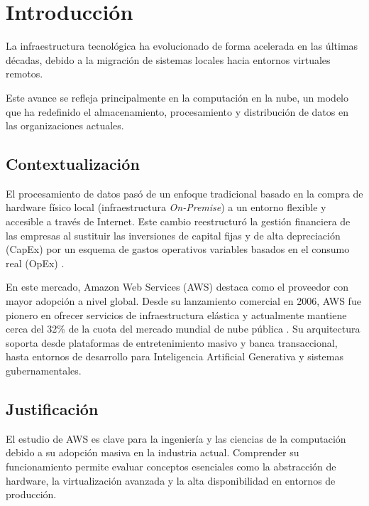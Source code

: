 \documentclass[12pt,a4paper]{article}
\begin{document}
\tableofcontents
\newpage

\section{Introducción}

La infraestructura tecnológica ha evolucionado de forma acelerada en las últimas décadas, debido a la migración de sistemas locales hacia entornos virtuales remotos.

Este avance se refleja principalmente en la computación en la nube, un modelo que ha redefinido el almacenamiento, procesamiento y distribución de datos en las organizaciones actuales.

\subsection{Contextualización}

El procesamiento de datos pasó de un enfoque tradicional basado en la compra de hardware físico local (infraestructura \textit{On-Premise}) a un entorno flexible y accesible a través de Internet. Este cambio reestructuró la gestión financiera de las empresas al sustituir las inversiones de capital fijas y de alta depreciación (CapEx) por un esquema de gastos operativos variables basados en el consumo real (OpEx) \parencite{mell2011}. 

En este mercado, Amazon Web Services (AWS) destaca como el proveedor con mayor adopción a nivel global. Desde su lanzamiento comercial en 2006, AWS fue pionero en ofrecer servicios de infraestructura elástica y actualmente mantiene cerca del 32\% de la cuota del mercado mundial de nube pública \parencite{gartner2024, statista2025}. Su arquitectura soporta desde plataformas de entretenimiento masivo y banca transaccional, hasta entornos de desarrollo para Inteligencia Artificial Generativa y sistemas gubernamentales.

\subsection{Justificación}

El estudio de AWS es clave para la ingeniería y las ciencias de la computación debido a su adopción masiva en la industria actual. Comprender su funcionamiento permite evaluar conceptos esenciales como la abstracción de hardware, la virtualización avanzada y la alta disponibilidad en entornos de producción. 
\end{document}
